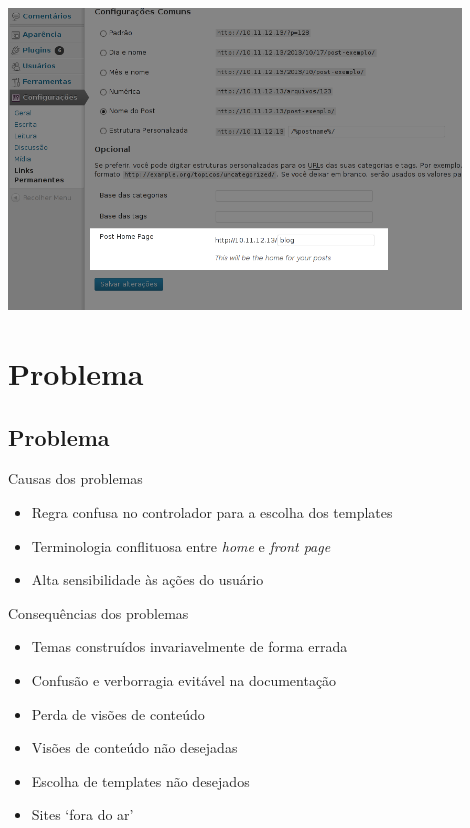 \documentclass{beamer}
\begin{document}
\begin{frame}
\begin{center}
  \includegraphics[width=0.9\textwidth]{./img/option-plugin-field.png}
\end{center}
\end{frame}

\section{Problema}
\subsection{Problema}

\begin{frame}{Causas dos problemas}
\begin{itemize}
  \pause \item Regra confusa no controlador para a escolha dos templates
  \pause \item Terminologia conflituosa entre \emph{home} e \emph{front page}
  \pause \item Alta sensibilidade às ações do usuário
\end{itemize}
\end{frame}

\begin{frame}{Consequências dos problemas}
\begin{itemize}
  \pause \item Temas construídos invariavelmente de forma errada
  \pause \item Confusão e verborragia evitável na documentação
  \pause \item Perda de visões de conteúdo
  \pause \item Visões de conteúdo não desejadas
  \pause \item Escolha de templates não desejados
  \pause \item Sites `fora do ar'
\end{itemize}
\end{frame}
\end{document}
